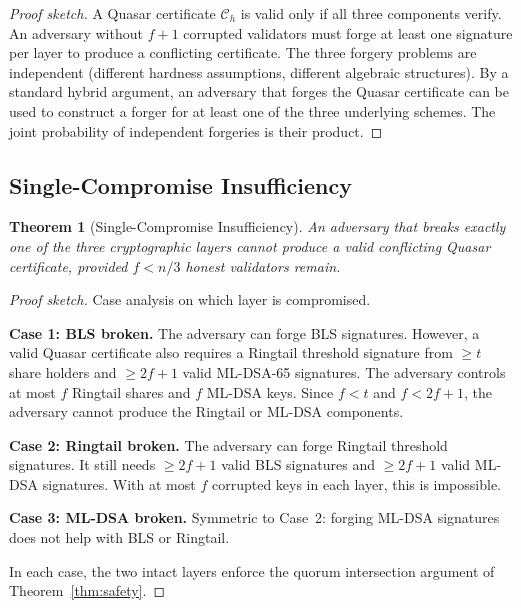 \documentclass[11pt,a4paper]{article}
\newtheorem{theorem}{Theorem}[section]
\begin{document}
\begin{proof}[Proof sketch]
A Quasar certificate $\mathcal{C}_h$ is valid only if all three components
verify. An adversary without $f+1$ corrupted validators must forge at least
one signature per layer to produce a conflicting certificate. The three
forgery problems are independent (different hardness assumptions, different
algebraic structures). By a standard hybrid argument, an adversary that
forges the Quasar certificate can be used to construct a forger for at least
one of the three underlying schemes. The joint probability of independent
forgeries is their product.
\end{proof}

\subsection{Single-Compromise Insufficiency}

\begin{theorem}[Single-Compromise Insufficiency]
\label{thm:single}
An adversary that breaks exactly one of the three cryptographic layers
cannot produce a valid conflicting Quasar certificate, provided $f < n/3$
honest validators remain.
\end{theorem}

\begin{proof}[Proof sketch]
Case analysis on which layer is compromised.

\textbf{Case 1: BLS broken.} The adversary can forge BLS signatures. However,
a valid Quasar certificate also requires a Ringtail threshold signature from
$\geq t$ share holders and $\geq 2f+1$ valid ML-DSA-65 signatures. The
adversary controls at most $f$ Ringtail shares and $f$ ML-DSA keys.
Since $f < t$ and $f < 2f+1$, the adversary cannot produce the Ringtail
or ML-DSA components.

\textbf{Case 2: Ringtail broken.} The adversary can forge Ringtail threshold
signatures. It still needs $\geq 2f+1$ valid BLS signatures and $\geq 2f+1$
valid ML-DSA signatures. With at most $f$ corrupted keys in each layer,
this is impossible.

\textbf{Case 3: ML-DSA broken.} Symmetric to Case~2: forging ML-DSA
signatures does not help with BLS or Ringtail.

In each case, the two intact layers enforce the quorum intersection argument
of Theorem~\ref{thm:safety}.
\end{proof}


\end{document}
